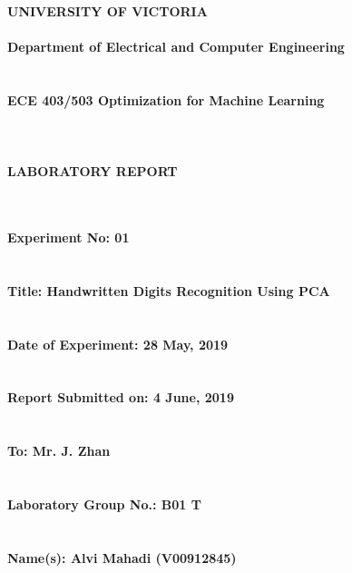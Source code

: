 \documentclass[11pt,a4paper,twoside]{article}
\begin{document}
\begin{center}
{\bf {\Huge UNIVERSITY OF VICTORIA} ~\\
	~\\
	{\huge Department of Electrical and Computer Engineering} ~\\
	~\\
	~\\
	{\huge ECE 403/503 Optimization for Machine Learning} ~\\
	~\\
	~\\
	~\\
	{\huge LABORATORY REPORT}
	~\\
	~\\
	~\\
}
\end{center}
{\bf
{\LARGE Experiment No: 01}
~\\
~\\
~\\
{\LARGE Title: Handwritten Digits Recognition Using PCA}
~\\
~\\
~\\
{\LARGE Date of Experiment: 28 May, 2019}
~\\
~\\
~\\
{\LARGE Report Submitted on: 4 June, 2019}
~\\
~\\
~\\
{\LARGE To: Mr. J. Zhan}
~\\
~\\
~\\
{\LARGE Laboratory Group No.: B01 T}
~\\
~\\
~\\
{\LARGE Name(s): Alvi Mahadi (V00912845)}
~\\
~\\
~\\
}

\newpage




\end{document}
